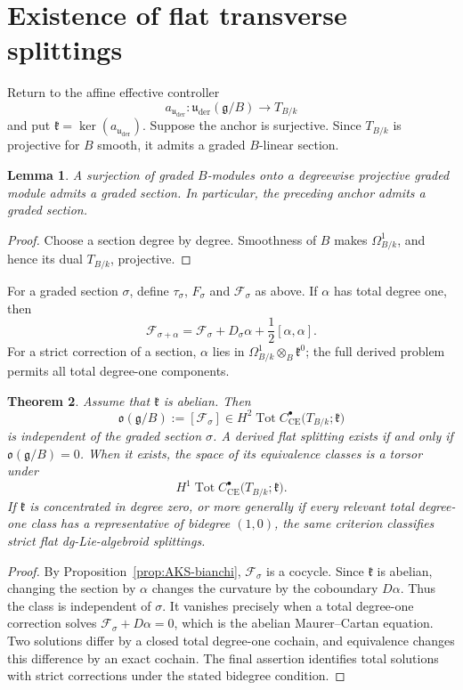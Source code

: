 \documentclass[11pt,reqno,a4paper,dvipsnames,x11names]{amsart}
\numberwithin{equation}{section}
\theoremstyle{plain}
\newtheorem{theorem}{Theorem}[section]
\newtheorem{lemma}[theorem]{Lemma}
\theoremstyle{definition}
\theoremstyle{remark}
\DeclareMathOperator{\Tot}{Tot}
\newcommand{\kk}{k}
\newcommand{\g}{\mathfrak g}
\newcommand{\kfr}{\mathfrak k}
\newcommand{\uuder}{\mathfrak u_{\mathrm{der}}}
\newcommand{\from}{\colon}
\begin{document}
\section{Existence of flat transverse splittings}\label{sec:existence}

Return to the affine effective controller
\[
 a_{\uuder}\from\uuder(\g/B)\longrightarrow T_{B/\kk}
\]
and put \(\kfr=\ker(a_{\uuder})\). Suppose the anchor is surjective. Since \(T_{B/\kk}\) is projective for \(B\) smooth, it admits a graded \(B\)-linear section.

\begin{lemma}\label{lem:graded-splitting-projective}
A surjection of graded \(B\)-modules onto a degreewise projective graded module admits a graded section. In particular, the preceding anchor admits a graded section.
\end{lemma}

\begin{proof}
Choose a section degree by degree. Smoothness of \(B\) makes \(\Omega^1_{B/\kk}\), and hence its dual \(T_{B/\kk}\), projective.
\end{proof}

For a graded section \(\sigma\), define \(\tau_\sigma\), \(F_\sigma\) and
\(\mathcal F_\sigma\) as above. If \(\alpha\) has total degree one, then
\[
 \mathcal F_{\sigma+\alpha}
 =\mathcal F_\sigma+D_\sigma\alpha
  +\frac12[\alpha,\alpha].
\]
For a strict correction of a section, \(\alpha\) lies in
\(\Omega^1_{B/\kk}\otimes_B\kfr^0\); the full derived problem permits all total degree-one components.

\begin{theorem}\label{thm:abelian-obstruction}
Assume that \(\kfr\) is abelian. Then
\[
 \mathfrak o(\g/B)
 :=[\mathcal F_\sigma]
 \in
 H^2\Tot C^\bullet_{\mathrm{CE}}
 \bigl(T_{B/\kk};\kfr\bigr)
\]
is independent of the graded section \(\sigma\). A derived flat splitting exists if and only if
\(\mathfrak o(\g/B)=0\). When it exists, the space of its equivalence classes is a torsor under
\[
 H^1\Tot C^\bullet_{\mathrm{CE}}
 \bigl(T_{B/\kk};\kfr\bigr).
\]
If \(\kfr\) is concentrated in degree zero, or more generally if every relevant total degree-one class has a representative of bidegree \((1,0)\), the same criterion classifies strict flat dg-Lie-algebroid splittings.
\end{theorem}

\begin{proof}
By Proposition~\ref{prop:AKS-bianchi}, \(\mathcal F_\sigma\) is a cocycle. Since \(\kfr\) is abelian, changing the section by \(\alpha\) changes the curvature by the coboundary \(D\alpha\). Thus the class is independent of \(\sigma\). It vanishes precisely when a total degree-one correction solves
\(\mathcal F_\sigma+D\alpha=0\), which is the abelian Maurer--Cartan equation. Two solutions differ by a closed total degree-one cochain, and equivalence changes this difference by an exact cochain. The final assertion identifies total solutions with strict corrections under the stated bidegree condition.
\end{proof}
\end{document}
